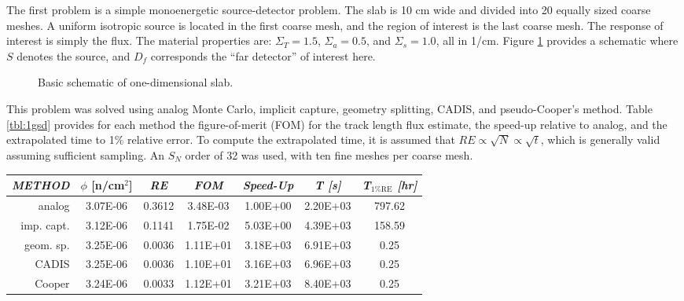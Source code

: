 The first problem is a simple monoenergetic source-detector problem.  The slab
is 10 cm wide and divided into 20 equally sized coarse meshes.  A uniform
isotropic source is located in the first coarse mesh, and the region of interest
is the last coarse mesh.  The response of interest is simply the flux.  The
material properties are: $\Sigma_T = 1.5$, $\Sigma_a = 0.5$, and $\Sigma_s =
1.0$, all in 1/cm.  Figure \ref{fig:diagram_of_slab} provides a schematic where
$S$ denotes the source, and $D_f$ corresponds the ``far detector'' of interest
here.

\begin{figure}[h] 
   \centering
   \caption{Basic schematic of one-dimensional slab.}
   \label{fig:diagram_of_slab}
\end{figure}

This problem was solved using analog Monte Carlo, implicit capture, geometry
splitting, CADIS, and pseudo-Cooper's method.  Table \ref{tbl:1gsd} provides for
each method the figure-of-merit (FOM) for the track length flux estimate, the
speed-up relative to analog, and the extrapolated time to 1\% relative error. 
To compute the extrapolated time, it is assumed that $RE \propto \sqrt{N}
\propto \sqrt{t}$, which is generally valid assuming sufficient sampling.  An
$S_N$ order of 32 was used, with ten fine meshes per coarse mesh.

\begin{table*}[th]
 \caption{Comparison of methods for one-dimensional, one group source-detector
problem.}
 \begin{center} 
 {\small
 \begin{tabular*}{0.90\textwidth}{@{\extracolsep{\fill}} rcccccc } 
  \toprule 
   \emph{ METHOD}  &  $\phi$ [n/cm$^2$]  &  \emph{ RE} & \emph{ FOM} &  \emph{ Speed-Up}
& \emph{ T [s]} & \emph{ T$_{\mathrm{1\% RE}}$ [hr]} \\
  \midrule 
   analog      & 3.07E-06 & 0.3612 & 3.48E-03 & 1.00E+00 & 2.20E+03 & 797.62 \\
   imp. capt.  & 3.12E-06 & 0.1141 & 1.75E-02 & 5.03E+00 & 4.39E+03 & 158.59 \\
   geom. sp.   & 3.25E-06 & 0.0036 & 1.11E+01 & 3.18E+03 & 6.91E+03 & 0.25 \\
   CADIS       & 3.25E-06 & 0.0036 & 1.10E+01 & 3.16E+03 & 6.96E+03 & 0.25 \\ 
   Cooper      & 3.24E-06 & 0.0033 & 1.12E+01 & 3.21E+03 & 8.40E+03 & 0.25 \\
  \bottomrule 
 \end{tabular*} 
 }
 \end{center} 
 \label{tbl:1gsd}  
\end{table*}

